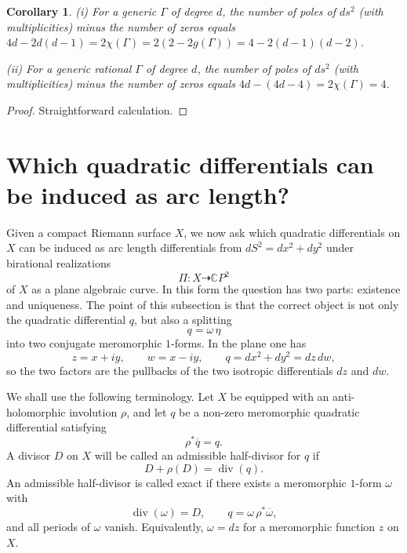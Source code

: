\documentclass[reqno]{amsart}
\newtheorem{corollary}{Corollary}
\newcommand{\bC}{\mathbb{C}}
\newcommand {\Ga}{\Gamma}
\theoremstyle{definition}
\theoremstyle{remark}
\theoremstyle{definition}
\theoremstyle{definition}
\theoremstyle{definition}
\begin{document}
 

\begin{corollary} \rm{(i)} For a generic $\Ga$ of degree $d$, the number of poles of $ds^2$ (with multiplicities) minus the number of zeros equals $4d - 2d(d-1)=2 \chi (\Ga)=2(2-2g(\Ga))=4 - 2(d-1)(d-2)$. 

\medskip
\noindent
\rm{(ii)}  For a generic rational $\Ga$ of degree $d$, the number of poles of $ds^2$ (with multiplicities) minus the number of zeros equals $4d - (4d-4)=2 \chi (\Ga)=4$.
\end{corollary}

\begin{proof} Straightforward calculation. \end{proof}


\section{Which quadratic differentials can be induced as arc length?}\label{sec:which}

Given a compact Riemann surface $X$, we now ask which quadratic differentials
on $X$ can be induced as arc length differentials from
$dS^2=dx^2+dy^2$ under birational realizations
\[
   \Pi:X\dashrightarrow \bC P^2
\]
of $X$ as a plane algebraic curve.  In this form the question has two parts:
existence and uniqueness.  The point of this subsection is that the correct
object is not only the quadratic differential $q$, but also a splitting
\[
   q=\omega\,\eta
\]
into two conjugate meromorphic $1$-forms.  In the plane one has
\[
   z=x+iy,\qquad w=x-iy,\qquad q=dx^2+dy^2=dz\,dw,
\]
so the two factors are the pullbacks of the two isotropic differentials
$dz$ and $dw$.

We shall use the following terminology.  Let $X$ be equipped with an
anti-holomorphic involution $\rho$, and let $q$ be a non-zero meromorphic
quadratic differential satisfying
\[
   \rho^*\overline q=q .
\]
A divisor $D$ on $X$ will be called an admissible half-divisor for $q$ if
\[
   D+\rho(D)=\operatorname{div}(q).
\]
An admissible half-divisor is called exact if there exists a meromorphic
$1$-form $\omega$ with
\[
   \operatorname{div}(\omega)=D,\qquad
   q=\omega\,\rho^*\overline{\omega},
\]
and all periods of $\omega$ vanish.  Equivalently, $\omega=dz$ for a
meromorphic function $z$ on $X$.
\end{document}
